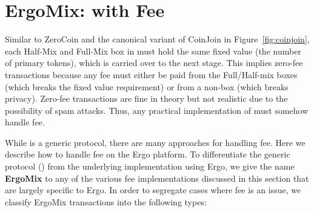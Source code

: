 \documentclass[11pt]{article}
\newcommand{\mixname}{ErgoMix\xspace}
\begin{document}

\section{\mixname: \algname with Fee}
\label{fee}

Similar to ZeroCoin and the canonical variant of CoinJoin in Figure~\ref{fig:coinjoin}, each Half-Mix and Full-Mix box in \algname must hold the same fixed value (the number of primary tokens), which is carried over to the next stage. This implies zero-fee transactions because any fee must either be paid from the Full/Half-mix boxes (which breaks the fixed value requirement) or from a non-\algname box (which breaks privacy). Zero-fee transactions are fine in theory but not realistic due to the possibility of spam attacks. Thus, any practical implementation of \algname must somehow handle fee. 

While \algname is a generic protocol, there are many approaches for handling fee. Here we describe how to handle fee on the Ergo platform. To differentiate the generic protocol (\algname) from the underlying implementation using Ergo, we give the name \textbf{\mixname} to any of the various fee implementations discussed in this section that are largely specific to Ergo. In order to segregate cases where fee is an issue, we classify \mixname transactions into the following types:
\end{document}
